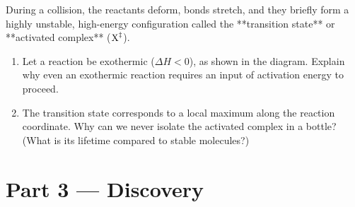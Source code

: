 \documentclass[12pt, a4paper]{book}
\begin{document}
\begin{explobox}
During a collision, the reactants deform, bonds stretch, and they briefly form a highly unstable, high-energy configuration called the **transition state** or **activated complex** ($\ce{X^\ddagger}$).
\begin{center}
\end{center}
\begin{enumerate}[label=(\alph*), leftmargin=*]
  \item Let a reaction be exothermic ($\Delta H < 0$), as shown in the diagram. Explain why even an exothermic reaction requires an input of activation energy to proceed.
  \item The transition state corresponds to a local maximum along the reaction coordinate. Why can we never isolate the activated complex in a bottle? (What is its lifetime compared to stable molecules?)
\end{enumerate}
\end{explobox}

\newpage

\section{Part 3 --- Discovery}
\end{document}
